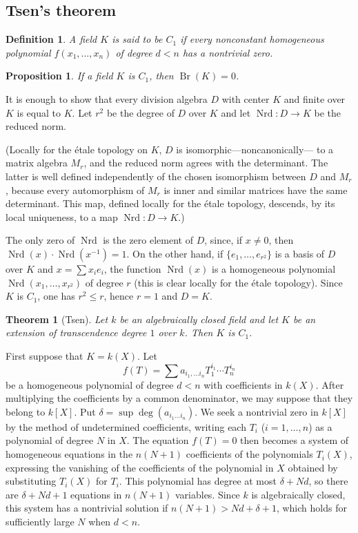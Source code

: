 \documentclass[12pt,oneside,english]{smfbook}
\DeclareMathOperator{\br}{Br}
\newtheorem{proposition}[subsubsection]{Proposition}
\newtheorem{definition}[subsubsection]{Definition}
\newtheorem{theorem}[subsubsection]{Theorem}
\begin{document}
\subsection{Tsen's theorem}\label{I:3-2}

\begin{definition}\label{I:3-2-1}
A field $K$ is said to be $C_1$ if every nonconstant homogeneous polynomial $f(x_1,\dotsc,x_n)$ of degree $d<n$ has a nontrivial zero.
\end{definition}

\begin{proposition}\label{I:3-2-2}
If a field $K$ is $C_1$, then $\br(K)=0$.
\end{proposition}

It is enough to show that every division algebra $D$ with center $K$ and finite over $K$ is equal to $K$. Let $r^2$ be the degree of $D$ over $K$ and let $\operatorname{Nrd}:D\to K$ be the reduced norm.

(Locally for the étale topology on $K$, $D$ is isomorphic---noncanonically--- to a matrix algebra $M_r$, and the reduced norm agrees with the determinant. The latter is well defined independently of the chosen isomorphism between $D$ and $M_r$, because every automorphism of $M_r$ is inner and similar matrices have the same determinant. This map, defined locally for the étale topology, descends, by its local uniqueness, to a map $\operatorname{Nrd}:D\to K$.)

The only zero of $\operatorname{Nrd}$ is the zero element of $D$, since, if $x\ne0$, then $\operatorname{Nrd}(x)\cdot\operatorname{Nrd}(x^{-1})=1$. On the other hand, if $\{e_1,\dotsc,e_{r^2}\}$ is a basis of $D$ over $K$ and $x=\sum x_ie_i$, the function $\operatorname{Nrd}(x)$ is a homogeneous polynomial $\operatorname{Nrd}(x_1,\dotsc,x_{r^2})$ of degree $r$ (this is clear locally for the étale topology). Since $K$ is $C_1$, one has $r^2\leqslant r$, hence $r=1$ and $D=K$.

\begin{theorem}[Tsen]\label{I:3-2-3}
Let $k$ be an algebraically closed field and let $K$ be an extension of transcendence degree $1$ over $k$. Then $K$ is $C_1$.
\end{theorem}

First suppose that $K=k(X)$. Let
\[
  f(T) = \sum a_{i_1,\dotsc i_n} T_1^{i_1} \dotsm T_n^{i_n}
\]
be a homogeneous polynomial of degree $d<n$ with coefficients in $k(X)$. After multiplying the coefficients by a common denominator, we may suppose that they belong to $k[X]$. Put $\delta=\sup\deg(a_{i_1\dotsc i_n})$. We seek a nontrivial zero in $k[X]$ by the method of undetermined coefficients, writing each $T_i$ ($i=1,\dotsc,n$) as a polynomial of degree $N$ in $X$. The equation $f(T)=0$ then becomes a system of homogeneous equations in the $n(N+1)$ coefficients of the polynomials $T_i(X)$, expressing the vanishing of the coefficients of the polynomial in $X$ obtained by substituting $T_i(X)$ for $T_i$. This polynomial has degree at most $\delta+Nd$, so there are $\delta+Nd+1$ equations in $n(N+1)$ variables. Since $k$ is algebraically closed, this system has a nontrivial solution if $n(N+1)>Nd+\delta+1$, which holds for sufficiently large $N$ when $d<n$.
\end{document}
